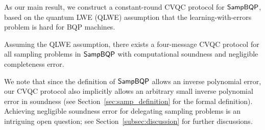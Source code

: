 

As our main result, we construct a constant-round CVQC protocol for $\operatorname{\mathsf{SampBQP}}$, based on the quantum LWE (QLWE) assumption that the learning-with-errors problem is hard for BQP machines. 
\begin{theorem}[informal] \label{thm:qpip0-informal}
Assuming the QLWE assumption, there exists a four-message CVQC protocol for all sampling problems in $\operatorname{\mathsf{SampBQP}}$ with computational soundness and negligible completeness error.
\end{theorem}

We note that since the definition of $\operatorname{\mathsf{SampBQP}}$ allows an inverse polynomial error, our CVQC protocol also implicitly allows an arbitrary small inverse polynomial error in  soundness (see Section~\ref{sec:samp_definition} for the formal definition). Achieving negligible soundness error for delegating sampling problems is an intriguing open question; see Section~\ref{subsec:discussion} for further discussions.











